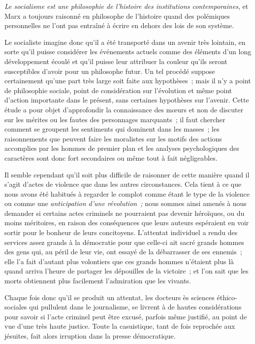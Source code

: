 \documentclass[french,twoside]{book} %
\begin{document}
 \emph{Le socialisme est une philosophie de l’histoire des institutions contemporaines}, et Marx a toujours raisonné en philosophe de l’histoire quand des polémiques personnelles ne l’ont pas entraîné à écrire en dehors des lois de son système.\par
Le socialiste imagine donc qu’il a été transporté dans un avenir très lointain, en sorte qu’il puisse considérer les événements actuels comme des éléments d’un long développement écoulé et qu’il puisse leur attribuer la couleur qu’ils seront susceptibles d’avoir pour un philosophe futur. Un tel procédé suppose certainement qu’une part très large soit faite aux hypothèses ; mais il n’y a point de philosophie sociale, point de considération sur l’évolution et même point d’action importante dans le présent, sans certaines hypothèses sur l’avenir. Cette étude a pour objet d’approfondir la connaissance des mœurs et non de discuter sur les mérites ou les fautes des personnages marquants ; il faut chercher comment se groupent les sentiments qui dominent dans les masses ; les raisonnements que peuvent faire les moralistes sur les motifs des actions accomplies par les hommes de premier plan et les analyses psychologiques des caractères sont donc fort secondaires ou même tout à fait négligeables.\par
Il semble cependant qu’il soit plus difficile de raisonner de cette manière quand il s’agit d’actes de violence que dans les autres circonstances. Cela tient à ce que nous avons été habitués à regarder le complot comme étant le type de la violence ou comme une \emph{anticipation d’une révolution ;} nous sommes ainsi amenés à nous demander si certains actes criminels ne pourraient pas devenir héroïques, ou du moins méritoires, en raison  des conséquences que leurs auteurs espéraient en voir sortir pour le bonheur de leurs concitoyens. L’attentat individuel a rendu des services assez grands à la démocratie pour que celle-ci ait sacré grands hommes des gens qui, au péril de leur vie, ont essayé de la débarrasser de ses ennemis ; elle l’a fait d’autant plus volontiers que ces grands hommes n’étaient plus là quand arriva l’heure de partager les dépouilles de la victoire ; et l’on sait que les morts obtiennent plus facilement l’admiration que les vivants.\par
Chaque fois donc qu’il se produit un attentat, les docteurs ès sciences éthico-sociales qui pullulent dans le journalisme, se livrent à de hautes considérations pour savoir si l’acte criminel peut être excusé, parfois même justifié, au point de vue d’une très haute justice. Toute la casuistique, tant de fois reprochée aux jésuites, fait alors irruption dans la presse démocratique.\par
\end{document}
